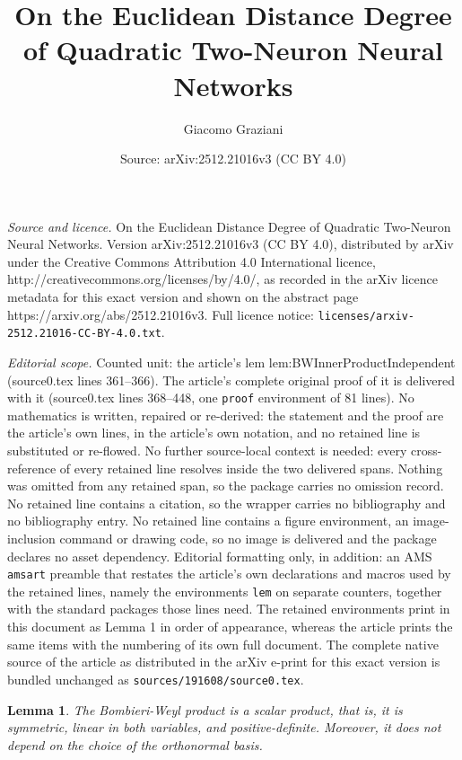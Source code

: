 \documentclass[10pt,a4paper]{amsart}
\title{On the Euclidean Distance Degree of Quadratic Two-Neuron Neural Networks}
\author{Giacomo Graziani}
\date{Source: arXiv:2512.21016v3 (CC BY 4.0)}
\newtheorem{lem}{Lemma}
\begin{document}
\maketitle

\noindent\emph{Source and licence.} On the Euclidean Distance Degree of Quadratic Two-Neuron Neural Networks. Version arXiv:2512.21016v3 (CC BY 4.0), distributed by arXiv under the Creative Commons Attribution 4.0 International licence, http://creativecommons.org/licenses/by/4.0/, as recorded in the arXiv licence metadata for this exact version and shown on the abstract page https://arxiv.org/abs/2512.21016v3. Full licence notice: \texttt{licenses/arxiv-2512.21016-CC-BY-4.0.txt}.\par\smallskip

\noindent\textit{Editorial scope.} Counted unit: the article's lem lem:BWInnerProductIndependent (source0.tex lines 361--366). The article's complete original proof of it is delivered with it (source0.tex lines 368--448, one \texttt{proof} environment of 81 lines). No mathematics is written, repaired or re-derived: the statement and the proof are the article's own lines, in the article's own notation, and no retained line is substituted or re-flowed.  No further source-local context is needed: every cross-reference of every retained line resolves inside the two delivered spans.  Nothing was omitted from any retained span, so the package carries no omission record.  No retained line contains a citation, so the wrapper carries no bibliography and no bibliography entry.  No retained line contains a figure environment, an image-inclusion command or drawing code, so no image is delivered and the package declares no asset dependency.  Editorial formatting only, in addition: an AMS \texttt{amsart} preamble that restates the article's own declarations and macros used by the retained lines, namely the environments \texttt{lem} on separate counters, together with the standard packages those lines need.  The retained environments print in this document as Lemma 1 in order of appearance, whereas the article prints the same items with the numbering of its own full document.  The complete native source of the article as distributed in the arXiv e-print for this exact version is bundled unchanged as \texttt{sources/191608/source0.tex}.
\begin{lem}
\label{lem:BWInnerProductIndependent}
The Bombieri-Weyl product is a scalar product, that is, it is
symmetric, linear in both variables, and positive-definite.
Moreover, it does not depend on the choice of the orthonormal basis.
\end{lem}
\end{document}
